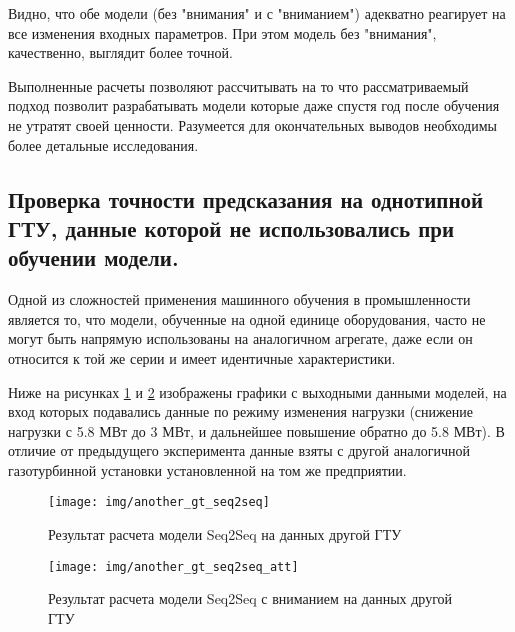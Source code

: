 \documentclass[12pt,a4paper]{article}
\begin{document}
Видно, что обе модели (без "внимания" и с "вниманием") адекватно реагирует на все изменения входных параметров. При этом модель без "внимания", качественно, выглядит более точной. 

Выполненные расчеты позволяют рассчитывать на то что рассматриваемый подход позволит разрабатывать модели которые даже спустя год после обучения не утратят своей ценности. Разумеется для окончательных выводов необходимы более детальные исследования.


\subsection{Проверка точности предсказания на однотипной ГТУ, данные которой не использовались при обучении модели.}


Одной из сложностей применения машинного обучения в промышленности является то, что модели, обученные на одной единице оборудования, часто не могут быть напрямую использованы на аналогичном агрегате, даже если он относится к той же серии и имеет идентичные характеристики.

Ниже на рисунках \ref{fig:another_gt_seq2seq} и \ref{fig:another_gt_seq2seq_att} изображены графики с выходными данными моделей, на вход которых подавались данные по режиму изменения нагрузки (снижение нагрузки с 5.8 МВт до 3 МВт, и дальнейшее повышение обратно до 5.8 МВт). В отличие от предыдущего эксперимента данные взяты с другой аналогичной газотурбинной установки установленной на том же предприятии.

\begin{figure}[htbp]
	\centering\texttt{[image: img/another\_gt\_seq2seq]}
	\caption{Результат расчета модели Seq2Seq на данных другой ГТУ}
	\label{fig:another_gt_seq2seq}
\end{figure}

\begin{figure}[htbp]
	\centering\texttt{[image: img/another\_gt\_seq2seq\_att]}
	\caption{Результат расчета модели Seq2Seq с вниманием на данных другой ГТУ}
	\label{fig:another_gt_seq2seq_att}
\end{figure}

\end{document}
